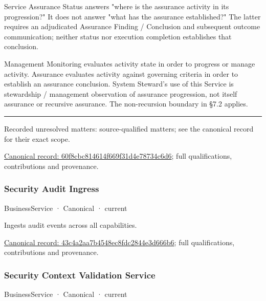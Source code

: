 Service Assurance Status answers "where is the assurance activity in its progression?" It does not answer "what has the assurance established?" The latter requires an adjudicated Assurance Finding / Conclusion and subsequent outcome communication; neither status nor execution completion establishes that conclusion.



Management Monitoring evaluates activity state in order to progress or manage activity. Assurance evaluates activity against governing criteria in order to establish an assurance conclusion. System Steward's use of this Service is stewardship / management observation of assurance progression, not itself assurance or recursive assurance. The non-recursion boundary in §7.2 applies.



\medskip\hrule\medskip

{\small Recorded unresolved matters: source-qualified matters; see the canonical record for their exact scope.}\par
{\footnotesize \href{../../../../continuum/business/business-service/60f8cbc814614f669f31d4e78734c6d6.md}{Canonical record: 60f8cbc814614f669f31d4e78734c6d6}; full qualifications, contributions and provenance.}\par
\subsubsection{Security Audit Ingress}

\label{element:43c4a2aa7b4548ec8fdc2844e3d666b6}
{\small BusinessService · Canonical · current}\par

Ingests audit events across all capabilities.


{\footnotesize \href{../../../../continuum/business/business-service/43c4a2aa7b4548ec8fdc2844e3d666b6.md}{Canonical record: 43c4a2aa7b4548ec8fdc2844e3d666b6}; full qualifications, contributions and provenance.}\par
\subsubsection{Security Context Validation Service}

\label{element:f1ff9e6542004a7584a385062cb0ed21}
{\small BusinessService · Canonical · current}\par

